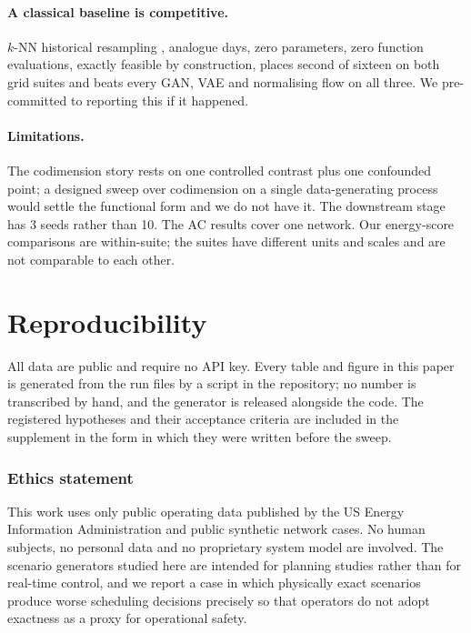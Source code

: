 \documentclass{article}
\begin{document}
\paragraph{A classical baseline is competitive.} $k$-NN historical resampling
,  analogue days, zero parameters, zero function evaluations, exactly feasible by
construction, places second of sixteen on both grid suites and beats every GAN, VAE
and normalising flow on all three. We pre-committed to reporting this if it happened.

\paragraph{Limitations.} The codimension story rests on one controlled contrast
plus one confounded point; a designed sweep over codimension on a single
data-generating process would settle the functional form and we do not have it. The
downstream stage has 3 seeds rather than 10. The AC results
cover one network. Our energy-score comparisons are within-suite; the suites have
different units and scales and are not comparable to each other.

\section{Reproducibility}\label{sec:repro}
All data are public and require no API key. Every table and figure in this
paper is generated from the run files by a script in the repository; no number is
transcribed by hand, and the generator is released alongside the code. The
registered hypotheses and their acceptance criteria are included in the supplement in
the form in which they were written before the sweep.

\subsubsection*{Ethics statement}
This work uses only public operating data published by the US Energy
Information Administration and public synthetic network cases. No human subjects, no
personal data and no proprietary system model are involved. The scenario generators
studied here are intended for planning studies rather than for real-time control, and
we report a case in which physically exact scenarios produce worse scheduling decisions
precisely so that operators do not adopt exactness as a proxy for operational safety.
\end{document}
